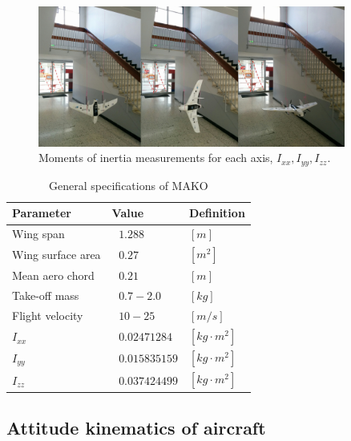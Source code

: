  \begin{figure}[!ht]
      \centering
      \includegraphics[width=0.9\textwidth]{figures/Mako_Inertia_combined_small.png}
      \caption{Moments of inertia measurements for each axis, $I_{xx} , I_{yy} , I_{zz} $.}
      \label{fig:inertia}
 \end{figure}
 
 \begin{table}[!htbp]
\caption{General specifications of MAKO \cite{bronz2016aerodynamic}}
\label{arm:MAKO}
\begin{center}
\begin{tabular}{ ||p{4cm}|p{3cm}|p{2cm}||}\hline
\textbf{Parameter} & \textbf{Value} & \textbf{Definition} \\\hline
Wing span                  & $\ \ \, 1.288 $	   & $[m]$ \\\hline
Wing surface area       & $ \ \ \, 0.27 $           &  $[m^2]$ \\\hline
Mean aero chord           & $\ \ \, 0.21$           & $[m]$ \\\hline
Take-off mass              & $\ \ \, 0.7 - 2.0$       & $[kg]$ \\\hline
Flight velocity              & $\ \ \, 10 - 25$       & $[m/s]$ \\\hline
$I_{xx}$                         & $\ \ \, 0.02471284$   & $[kg \cdot m^2]$ \\\hline
$I_{yy}$                         & $\ \ \, 0.015835159$   & $[kg \cdot m^2]$ \\\hline
$I_{zz}$                         & $\ \ \, 0.037424499$   & $[kg \cdot m^2]$ \\\hline
\end{tabular}
\end{center}
\end{table}


\subsection{Attitude kinematics of aircraft}

